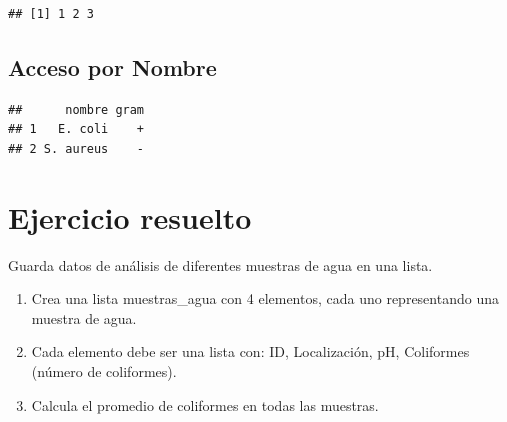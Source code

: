\documentclass[
]{book}
\newenvironment{Shaded}{\begin{snugshade}}{\end{snugshade}}
\newcommand{\CommentTok}[1]{\textcolor[rgb]{0.56,0.35,0.01}{\textit{#1}}}
\newcommand{\FunctionTok}[1]{\textcolor[rgb]{0.13,0.29,0.53}{\textbf{#1}}}
\newcommand{\NormalTok}[1]{#1}
\newcommand{\OtherTok}[1]{\textcolor[rgb]{0.56,0.35,0.01}{#1}}
\newcommand{\SpecialCharTok}[1]{\textcolor[rgb]{0.81,0.36,0.00}{\textbf{#1}}}
\providecommand{\tightlist}{%
  \setlength{\itemsep}{0pt}\setlength{\parskip}{0pt}}
\begin{document}
\begin{verbatim}
## [1] 1 2 3
\end{verbatim}

\subsection{Acceso por Nombre}\label{acceso-por-nombre}

\begin{Shaded}
\end{Shaded}

\begin{verbatim}
##      nombre gram
## 1   E. coli    +
## 2 S. aureus    -
\end{verbatim}

\section{Ejercicio resuelto}\label{ejercicio-resuelto}

Guarda datos de análisis de diferentes muestras de agua en una lista.

\begin{enumerate}
\def\labelenumi{\arabic{enumi}.}
\tightlist
\item
  Crea una lista muestras\_agua con 4 elementos, cada uno representando una muestra de agua.
\item
  Cada elemento debe ser una lista con: ID, Localización, pH, Coliformes (número de coliformes).
\item
  Calcula el promedio de coliformes en todas las muestras.
\end{enumerate}
\end{document}
